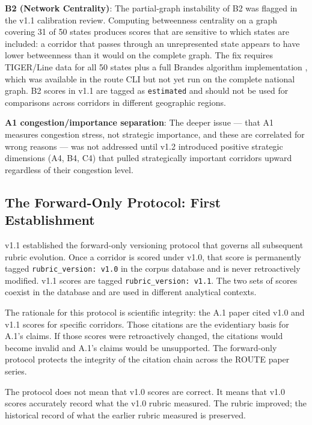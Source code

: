 \textbf{B2 (Network Centrality)}: The partial-graph instability of B2 was flagged in the v1.1 calibration review. Computing betweenness centrality on a graph covering 31 of 50 states produces scores that are sensitive to which states are included: a corridor that passes through an unrepresented state appears to have lower betweenness than it would on the complete graph. The fix requires TIGER/Line data for all 50 states plus a full Brandes algorithm implementation \citep{Brandes2001}, which was available in the route CLI but not yet run on the complete national graph. B2 scores in v1.1 are tagged as \texttt{estimated} and should not be used for comparisons across corridors in different geographic regions.

\textbf{A1 congestion/importance separation}: The deeper issue --- that A1 measures congestion stress, not strategic importance, and these are correlated for wrong reasons --- was not addressed until v1.2 introduced positive strategic dimensions (A4, B4, C4) that pulled strategically important corridors upward regardless of their congestion level.

\subsection{The Forward-Only Protocol: First Establishment}

v1.1 established the forward-only versioning protocol that governs all subsequent rubric evolution. Once a corridor is scored under v1.0, that score is permanently tagged \texttt{rubric\_version: v1.0} in the corpus database and is never retroactively modified. v1.1 scores are tagged \texttt{rubric\_version: v1.1}. The two sets of scores coexist in the database and are used in different analytical contexts.

The rationale for this protocol is scientific integrity: the A.1 paper \citep{ROUTE_A1} cited v1.0 and v1.1 scores for specific corridors. Those citations are the evidentiary basis for A.1's claims. If those scores were retroactively changed, the citations would become invalid and A.1's claims would be unsupported. The forward-only protocol protects the integrity of the citation chain across the ROUTE paper series.

The protocol does not mean that v1.0 scores are correct. It means that v1.0 scores accurately record what the v1.0 rubric measured. The rubric improved; the historical record of what the earlier rubric measured is preserved.
